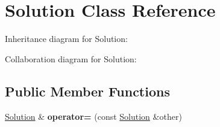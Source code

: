 \hypertarget{class_solution}{}\section{Solution Class Reference}
\label{class_solution}


Inheritance diagram for Solution\+:


Collaboration diagram for Solution\+:
\subsection*{Public Member Functions}
\begin{DoxyCompactItemize}
\item 
\mbox{\label{class_solution_a8da0e412cdefa6e44c35fc5a8b96ee02}} 
\mbox{\hyperlink{class_solution}{Solution}} \& {\bfseries operator=} (const \mbox{\hyperlink{class_solution}{Solution}} \&other)
\end{DoxyCompactItemize}
